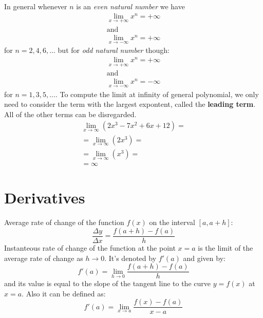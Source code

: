 \documentclass{article}
\begin{document}
In general whenever $n$ is an \textit{even natural number} we have
\begin{equation}
  \begin{gathered}
    \lim_{x \to +\infty}x^n = +\infty \\
    \text{and} \\
    \lim_{x \to -\infty}x^n = +\infty
  \end{gathered}
\end{equation}
for $n = 2, 4, 6, ...$ but for \textit{odd natural number} though:
\begin{equation}
  \begin{gathered}
    \lim_{x \to +\infty}x^n = +\infty \\
    \text{and} \\
    \lim_{x \to -\infty}x^n = -\infty
  \end{gathered}
\end{equation}
for $n = 1, 3, 5, ...$. To compute the limit at infinity of general polynomial, we only need
to consider the term with the largest expontent, called the \textbf{leading term}.
All of the other terms can be disregarded.
\begin{equation}
  \begin{gathered}
    \lim_{x \to \infty}(2x^3 - 7x^2 + 6x + 12) = \\
    = \lim_{x \to \infty}(2x^3) = \\
    = \lim_{x \to \infty}(x^3) = \\
    = \infty
  \end{gathered}
\end{equation}
\section{Derivatives}
Average rate of change of the function $f(x)$ on the interval $[a, a+h]$:
\begin{equation}
  \frac{\Delta y}{\Delta x} = \frac{f(a+h) - f(a)}{h}
\end{equation}
Instanteous rate of change of the function at the point $x=a$ is the limit of the average
rate of change as $h \rightarrow 0$. It's denoted by $f'(a)$ and given by:
\begin{equation}
  f'(a) = \lim_{h \rightarrow 0}\frac{f(a+h) - f(a)}{h}
\end{equation}
and its value is equal to the slope of the tangent line to the curve $y = f(x)$ at $x=a$.
Also it can be defined as:
\begin{equation}
  f'(a) = \lim_{x \rightarrow a}\frac{f(x) - f(a)}{x-a}
\end{equation}
\end{document}
